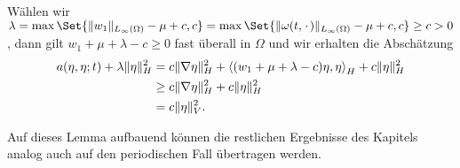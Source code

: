 \begin{Lemma}
\begin{Beweis}
        Wählen wir $\lambda = \max\Set{\norm{w_{1}}_{L_{\infty}(\Omega)} - \mu + c, c} = \max\Set{\norm{\omega(t, \blank)}_{L_{\infty}(\Omega)} - \mu + c, c} \geq c > 0$, dann gilt $w_{1} + \mu + \lambda - c \geq 0$ fast überall in $\Omega$ und wir erhalten die Abschätzung
        \begin{align}
            a(\eta, \eta; t) + \lambda \lVert\eta\rVert^{2}_{H}
            &= c \lVert\nabla \eta\rVert^{2}_{H} + \left\langle(w_{1} + \mu + \lambda - c) \eta,\eta\right\rangle_{H} + c \lVert\eta\rVert^{2}_{H} \\
            &\geq c \lVert\nabla \eta\rVert^{2}_{H} + c \lVert\eta\rVert^{2}_{H}
            \\&= c \lVert\eta\rVert^{2}_{V}.
        \end{align}
    \end{Beweis}
\end{Lemma}

Auf dieses Lemma aufbauend können die restlichen Ergebnisse des Kapitels analog auch auf den periodischen Fall übertragen werden.

